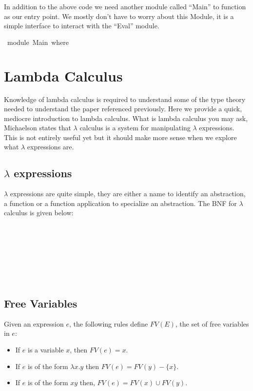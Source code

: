 \documentclass[a4paper,11pt]{article}
\begin{document}
In addition to the above code we need another module called ``Main'' to function as our entry point. We mostly don't have to worry about this Module, it is a simple interface to 
interact with the ``Eval'' module. 
\begin{tabbing}\ttfamily
~module~Main~where
\end{tabbing}

\section{Lambda Calculus}
Knowledge of lambda calculus is required to understand some of the type theory needed to understand the paper referenced previously. Here we 
provide a quick, mediocre introduction to lambda calculus. What is lambda calculus you may ask, Michaelson states that $\lambda$ calculus is a system for manipulating $\lambda$ expressions.
This is not entirely useful yet but it should make more sense when we explore what $\lambda$ expressions are. 

\subsection{$\lambda$ expressions}
$\lambda$ expressions are quite simple, they are either a name to identify an abstraction, a function or a function application to specialize an abstraction. 
The BNF for $\lambda$ calculus is given below:
\begin{bnf*}
   \bnfor {} \bnfor {} \\
   \bnfsk {} \\ 
  \bnfts{$\lambda$}   \\
   \\ 
  \bnfts{(}  \ \  \bnfts{)} \\
   \\
\end{bnf*}

\subsection{Free Variables}
Given an expression $e$, the following rules define $FV(E)$, the set of free variables in $e$:
\begin{itemize}
  \item If $e$ is a variable $x$, then $FV(e) = x$. 
  \item If $e$ is of the form $\lambda x.y$ then $FV(e) = FV(y) - \{x\}$.
  \item If $e$ is of the form $xy$ then, $FV(e) = FV(x) \cup FV(y)$.
\end{itemize}
\end{document}
